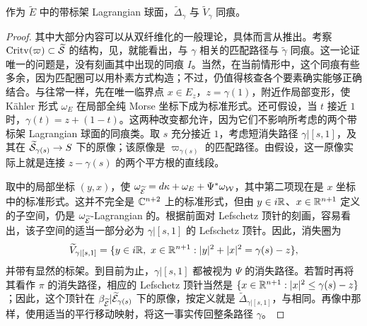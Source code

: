 \begin{lemma}\label{st:18.2}
作为 $\widetilde E$ 中的带标架 Lagrangian 球面，$\widetilde\Delta_\gamma$ 与 $\widetilde V_\gamma$ 同痕。
\end{lemma}
\begin{proof}
其中大部分内容可以从双纤维化的一般理论，具体而言从推出。考察 $\operatorname{Critv}(\varpi)\subset\widetilde{\mathcal S}$ 的结构，见，就能看出，与 $\gamma$ 相关的匹配路径与 $\widetilde\gamma$ 同痕。这一论证唯一的问题是，没有刻画其中出现的同痕 $I$。当然，在当前情形中，这个同痕有些多余，因为匹配圈可以用朴素方式构造；不过，仍值得核查各个要素确实能够正确结合。与往常一样，先在唯一临界点 $x\in E_z$，$z=\gamma(1)$，附近作局部变形，使 Kähler 形式 $\omega_E$ 在局部全纯 Morse 坐标下成为标准形式。还可假设，当 $t$ 接近 $1$ 时，$\gamma(t)=z+(1-t)$。这两种改变都允许，因为它们不影响所考虑的两个带标架 Lagrangian 球面的同痕类。取 $s$ 充分接近 $1$，考虑短消失路径 $\gamma|[s,1]$，及其在 $\widetilde{\mathcal S}_{\gamma(s)}\to S$ 下的原像；该原像是 $\varpi_{\gamma(s)}$ 的匹配路径。由假设，这一原像实际上就是连接 $z-\gamma(s)$ 的两个平方根的直线段。

取中的局部坐标 $(y,x)$，使 $\omega_{\widetilde{\mathcal E}}=d\kappa+\omega_E+\Psi^*\omega_{\mathcal W}$，其中第二项现在是 $x$ 坐标中的标准形式。这并不完全是 $\mathbb C^{n+2}$ 上的标准形式，但由 $y\in i\mathbb R$、$x\in\mathbb R^{n+1}$ 定义的子空间，仍是 $\omega_{\widetilde{\mathcal E}}$-Lagrangian 的。根据前面对 Lefschetz 顶针的刻画，容易看出，该子空间的适当一部分必为 $\gamma|[s,1]$ 的 Lefschetz 顶针。因此，消失圈为
\begin{equation}\label{eq:18.13}
\widetilde V_{\gamma|[s,1]}=\{y\in i\R,\ x\in\R^{n+1}:|y|^2+|x|^2=\gamma(s)-z\},
\end{equation}
并带有显然的标架。到目前为止，$\gamma|[s,1]$ 都被视为 $\Psi$ 的消失路径。若暂时再将其看作 $\pi$ 的消失路径，相应的 Lefschetz 顶针当然是 $\{x\in\mathbb R^{n+1}:|x|^2\le\gamma(s)-z\}$；因此，这个顶针在 $\beta_{\widetilde{\mathcal E}}|\widetilde{\mathcal E}_{\gamma(s)}$ 下的原像，按定义就是 $\widetilde\Delta_{\gamma|[s,1]}$，与相同。再像中那样，使用适当的平行移动映射，将这一事实传回整条路径 $\gamma$。
\end{proof}

